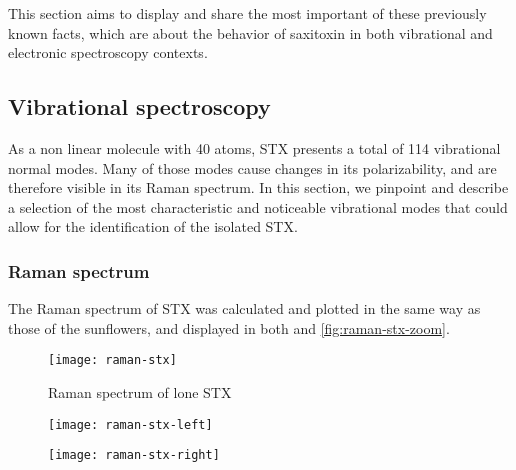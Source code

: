 This section aims to display and share the most important of these previously known facts, which are about the behavior of saxitoxin in both vibrational and electronic spectroscopy contexts.

\subsection{Vibrational spectroscopy}
As a non linear molecule with 40 atoms, STX presents a total of 114 vibrational normal modes.
Many of those modes cause changes in its polarizability, and are therefore visible in its Raman spectrum.
In this section, we pinpoint and describe a selection of the most characteristic and noticeable vibrational modes that could allow for the identification of the isolated STX.

\subsubsection{Raman spectrum}
The Raman spectrum of STX was calculated and plotted in the same way as those of the sunflowers, and displayed in both  and \ref{fig:raman-stx-zoom}.

\begin{figure}
    \texttt{[image: raman-stx]}
    \caption[Raman spectrum of lone STX]{Raman spectrum of lone STX}
\end{figure}

\begin{figure*}
    \begin{subfigure}{8.25cm}\centering\texttt{[image: raman-stx-left]}\end{subfigure}%
    \begin{subfigure}{8.25cm}\centering\texttt{[image: raman-stx-right]}\end{subfigure}
    \caption[Zoomed in Raman spectrum of lone STX]{Zoomed in Raman spectrum of lone STX with annotated vibrational modes}
    \label{fig:raman-stx-zoom}
\end{figure*}


